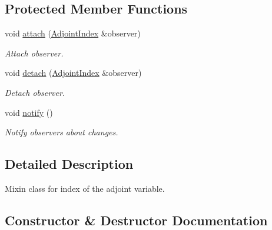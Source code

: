 \subsection*{Protected Member Functions}
\begin{DoxyCompactItemize}
\item 
\hypertarget{classSpacy_1_1Mixin_1_1MixinConnection_abb5520ee6b22dd993d78f142939a1ed4}{}void \hyperlink{classSpacy_1_1Mixin_1_1MixinConnection_abb5520ee6b22dd993d78f142939a1ed4}{attach} (\hyperlink{classSpacy_1_1Mixin_1_1AdjointIndex}{Adjoint\+Index} \&observer)\label{classSpacy_1_1Mixin_1_1MixinConnection_abb5520ee6b22dd993d78f142939a1ed4}

\begin{DoxyCompactList}\small\item\em Attach observer. \end{DoxyCompactList}\item 
\hypertarget{classSpacy_1_1Mixin_1_1MixinConnection_adda739590c487679c26f60e50aedb73f}{}void \hyperlink{classSpacy_1_1Mixin_1_1MixinConnection_adda739590c487679c26f60e50aedb73f}{detach} (\hyperlink{classSpacy_1_1Mixin_1_1AdjointIndex}{Adjoint\+Index} \&observer)\label{classSpacy_1_1Mixin_1_1MixinConnection_adda739590c487679c26f60e50aedb73f}

\begin{DoxyCompactList}\small\item\em Detach observer. \end{DoxyCompactList}\item 
\hypertarget{classSpacy_1_1Mixin_1_1MixinConnection_a1ddeaa78a3bb4a38c2cca36d1f99fe36}{}void \hyperlink{classSpacy_1_1Mixin_1_1MixinConnection_a1ddeaa78a3bb4a38c2cca36d1f99fe36}{notify} ()\label{classSpacy_1_1Mixin_1_1MixinConnection_a1ddeaa78a3bb4a38c2cca36d1f99fe36}

\begin{DoxyCompactList}\small\item\em Notify observers about changes. \end{DoxyCompactList}\end{DoxyCompactItemize}


\subsection{Detailed Description}
Mixin class for index of the adjoint variable. 

\subsection{Constructor \& Destructor Documentation}
\hypertarget{classSpacy_1_1Mixin_1_1AdjointIndex_a18dca16025bfc2af67da2eee34be9699_a18dca16025bfc2af67da2eee34be9699}{}
